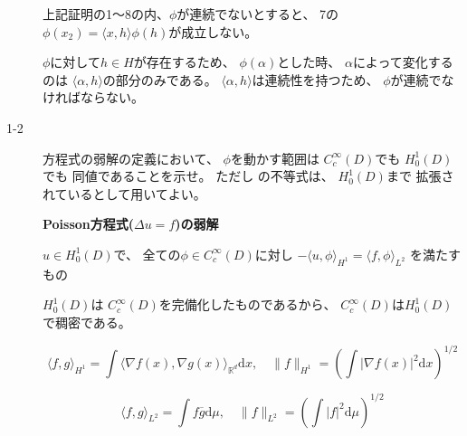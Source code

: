\documentclass[12pt,b5paper]{ltjsarticle}
\begin{document}
\begin{description}
            \dotfill

            上記証明の1～8の内、$\phi$が連続でないとすると、
            7の$\phi(x_{2}) = \langle x,h \rangle \phi(h)$が成立しない。

            $\phi$に対して$h\in H$が存在するため、
            $\phi(\alpha)$とした時、
            $\alpha$によって変化するのは
            $\langle \alpha,h \rangle$の部分のみである。
            $\langle \alpha,h \rangle$は連続性を持つため、
            $\phi$が連続でなければならない。

            \hrulefill

 \item[1-2]
             方程式の弱解の定義において、
            $\phi$を動かす範囲は
            $C_{c}^{\infty}(D)$でも
            $H_{0}^{1}(D)$でも
            同値であることを示せ。
            ただし  の不等式は、
            $H_{0}^{1}(D)$まで
            拡張されているとして用いてよい。


            \textbf{Poisson方程式($\Delta u = f$)の弱解}
            
            $u\in H_{0}^{1}(D)$で、
            全ての$\phi \in C_{c}^{\infty}(D)$に対し
            $-\langle u,\phi \rangle _{H^{1}}=\langle f,\phi \rangle_{L^{2}}$
            を満たすもの

            \dotfill


            $H_{0}^{1}(D)$は
            $C_{c}^{\infty}(D)$を完備化したものであるから、
            $C_{c}^{\infty}(D)$は$H_{0}^{1}(D)$で稠密である。



            \begin{equation}
             \langle f,g \rangle_{H^{1}}
              =\int \langle \nabla f(x), \nabla g(x) \rangle_{\mathbb{R}^{d}} \mathrm{d}x
              ,\quad
              \| f \|_{H^{1}}
              = \left( \int \lvert \nabla f(x) \rvert^{2} \mathrm{d}x \right)^{1/2}
            \end{equation}

            \begin{equation}
             \langle f,g \rangle_{L^{2}}
              =\int f \overline{g} \mathrm{d}\mu
              ,\quad
              \| f \|_{L^{2}}
              =\left(\int \lvert f \rvert^{2} \mathrm{d}\mu \right)^{1/2}
            \end{equation}




\end{description}
\end{document}
